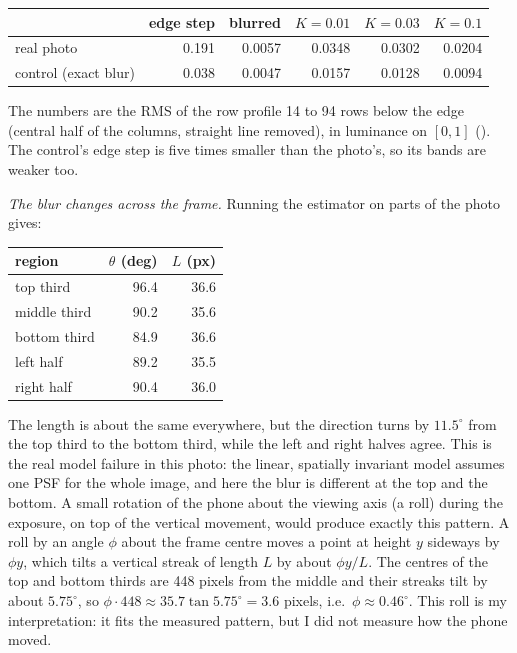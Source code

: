 \begin{center}
\begin{tabular}{lrrrrr}
\toprule
& edge step & blurred & $K=0.01$ & $K=0.03$ & $K=0.1$\\
\midrule
real photo & 0.191 & 0.0057 & 0.0348 & 0.0302 & 0.0204\\
control (exact blur) & 0.038 & 0.0047 & 0.0157 & 0.0128 & 0.0094\\
\bottomrule
\end{tabular}
\end{center}

The numbers are the RMS of the row profile 14 to 94 rows below the edge (central
half of the columns, straight line removed), in luminance on $[0,1]$
(). The control's edge step is five times smaller than the
photo's, so its bands are weaker too.

\emph{The blur changes across the frame.} Running the estimator on parts of the
photo gives:

\begin{center}
\begin{tabular}{lrr}
\toprule
region & $\theta$ (deg) & $L$ (px)\\
\midrule
top third & 96.4 & 36.6\\
middle third & 90.2 & 35.6\\
bottom third & 84.9 & 36.6\\
left half & 89.2 & 35.5\\
right half & 90.4 & 36.0\\
\bottomrule
\end{tabular}
\end{center}

The length is about the same everywhere, but the direction turns by $11.5^\circ$
from the top third to the bottom third, while the left and right halves agree.
This is the real model failure in this photo: the linear, spatially invariant model
assumes one PSF for the whole image, and here the blur is different at the top and
the bottom. A small rotation of the phone about the viewing axis (a roll) during
the exposure, on top of the vertical movement, would produce exactly this pattern.
A roll by an angle $\phi$ about the frame centre moves a point at height $y$
sideways by $\phi y$, which tilts a vertical streak of length $L$ by about
$\phi y/L$. The centres of the top and bottom thirds are 448 pixels from the
middle and their streaks tilt by about $5.75^\circ$, so
$\phi\cdot448\approx35.7\tan5.75^\circ=3.6$ pixels, i.e.\ $\phi\approx0.46^\circ$.
This roll is my interpretation: it fits the measured pattern, but I did not
measure how the phone moved.

